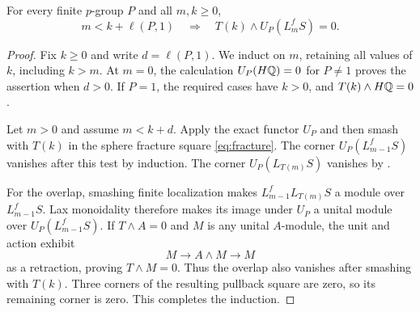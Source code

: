 \begin{corollary}\label{cor:finite-gluing}
For every finite \(p\)-group \(P\) and all \(m,k\ge0\),
\begin{equation}\label{eq:finite-gluing}
 m<k+\ell(P,1)\quad\Longrightarrow\quad
 T(k)\wedge U_P(L_m^fS)=0.
\end{equation}
\end{corollary}
\begin{proof}
Fix \(k\ge0\) and write \(d=\ell(P,1)\).  We induct on \(m\),
retaining all values of \(k\), including \(k>m\).  At \(m=0\),
the calculation \(U_P(H\mathbb Q)=0\) for \(P\ne1\) proves the
assertion when \(d>0\).  If \(P=1\), the required cases have
\(k>0\), and \(T(k)\wedge H\mathbb Q=0\).

Let \(m>0\) and assume \(m<k+d\).  Apply the exact functor
\(U_P\) and then smash with \(T(k)\) in the sphere fracture square
\eqref{eq:fracture}.  The corner \(U_P(L_{m-1}^fS)\) vanishes after
this test by induction.  The corner \(U_P(L_{T(m)}S)\) vanishes by
.

For the overlap, smashing finite localization makes
\(L_{m-1}^fL_{T(m)}S\) a module over \(L_{m-1}^fS\).
Lax monoidality therefore makes its image under \(U_P\) a unital
module over \(U_P(L_{m-1}^fS)\).  If \(T\wedge A=0\) and \(M\)
is any unital \(A\)-module, the unit and action exhibit
\[
 M\longrightarrow A\wedge M\longrightarrow M
\]
as a retraction, proving \(T\wedge M=0\).  Thus the overlap also
vanishes after smashing with \(T(k)\).  Three corners of the
resulting pullback square are zero, so its remaining corner is zero.
This completes the induction.
\end{proof}
